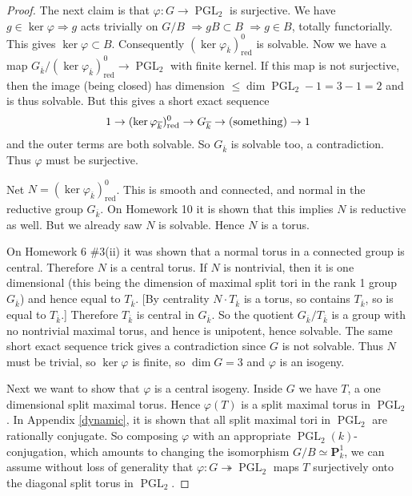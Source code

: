 \documentclass[10pt]{article}
\renewcommand{\phi}{\varphi}
\renewcommand{\(}{\left(}
\renewcommand{\)}{\right)}
\numberwithin{thm}{subsection}
\begin{document}
\begin{proof}
The next claim is that $\phi:G\rightarrow\operatorname{PGL}_2$ is surjective.
We have $g\in \operatorname{ker}\phi\ensuremath{\Rightarrow}g$ acts trivially on $G/B$ \ensuremath{\Rightarrow}$gB\subset B$ \ensuremath{\Rightarrow}$g\in B$,
totally functorially.
This gives $\operatorname{ker}\phi\subset B$.
Consequently $(\operatorname{ker}\phi_{\overline{k}})^0_\mathrm{red}$ is solvable.
Now we have a map $G_{\overline{k}}/(\operatorname{ker}\phi_{\overline{k}})^0_{\mathrm{red}} \rightarrow\operatorname{PGL}_2$ with finite kernel.
If this map is not surjective, then the image (being closed)
has dimension $\leq \dim \operatorname{PGL}_2 - 1 = 3 - 1 =2$ and is thus solvable.
But this gives a short exact sequence
\[1\rightarrow(\operatorname{ker}\phi_{\overline{k}})^0_\mathrm{red}\rightarrow G_{\overline{k}}\rightarrow(
{\rm{something}})\rightarrow1\]
and the outer terms are both solvable.
So $G_{\overline{k}}$ is solvable too, a contradiction.
Thus $\phi$ must be surjective.

Net $N=(\operatorname{ker}\phi_{\overline{k}})^0_\mathrm{red}$.
This is smooth and connected, and normal in the reductive group $G_{\overline{k}}$. On Homework 10 it is shown that this implies $N$ is reductive as well.
But we already saw $N$ is solvable. Hence $N$ is a torus.

On Homework 6 \#3(ii) it was shown that a normal torus in a connected group is central. Therefore $N$ is a central torus.
If $N$ is nontrivial, then it is one dimensional (this being the dimension of maximal split tori in the rank 1 group $G_{\overline{k}}$)
and hence equal to $T_{\overline{k}}$. [By centrality $N\cdot T_{\overline{k}}$
is a torus, so contains $T_{\overline{k}}$, so is equal to $T_{\overline{k}}$.]
Therefore $T_{\overline{k}}$ is central in $G_{\overline{k}}$.
So the quotient $G_{\overline{k}}/T_{\overline{k}}$ is a group
with no nontrivial maximal torus, and hence is unipotent, hence solvable.
The same short exact sequence trick gives a contradiction since $G$ is not solvable. Thus $N$ must be trivial, so $\operatorname{ker}\phi$ is finite,
so $\dim G=3$ and $\phi$ is an isogeny.

Next we want to show that $\phi$ is a central isogeny.
Inside $G$ we have $T$, a one dimensional split maximal torus.
Hence $\phi(T)$ is a split maximal torus in $\operatorname{PGL}_2$.
In Appendix \ref{dynamic}, it is shown 
that all split maximal tori in $\operatorname{PGL}_2$ are rationally conjugate.
So composing $\phi$ with an appropriate $\operatorname{PGL}_2(k)$-conjugation,
which amounts to changing the isomorphism $G/B\simeq \mathbf{P}^1_k$,
we can assume without loss of generality that $\phi:G\twoheadrightarrow\operatorname{PGL}_2$ maps $T$ surjectively onto the diagonal split torus in $\operatorname{PGL}_2$.


\end{proof}
\end{document}
